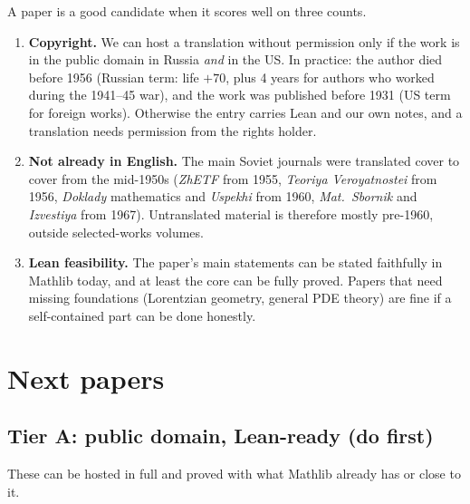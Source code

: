 \documentclass[11pt]{article}
\begin{document}
A paper is a good candidate when it scores well on three counts.
\begin{enumerate}
\item \textbf{Copyright.} We can host a translation without permission only if the work is in the public domain in Russia \emph{and} in the US. In practice: the author died before 1956 (Russian term: life $+70$, plus 4 years for authors who worked during the 1941--45 war), and the work was published before 1931 (US term for foreign works). Otherwise the entry carries Lean and our own notes, and a translation needs permission from the rights holder.
\item \textbf{Not already in English.} The main Soviet journals were translated cover to cover from the mid-1950s (\emph{ZhETF} from 1955, \emph{Teoriya Veroyatnostei} from 1956, \emph{Doklady} mathematics and \emph{Uspekhi} from 1960, \emph{Mat.\ Sbornik} and \emph{Izvestiya} from 1967). Untranslated material is therefore mostly pre-1960, outside selected-works volumes.
\item \textbf{Lean feasibility.} The paper's main statements can be stated faithfully in Mathlib today, and at least the core can be fully proved. Papers that need missing foundations (Lorentzian geometry, general PDE theory) are fine if a self-contained part can be done honestly.
\end{enumerate}

\section{Next papers}

\subsection{Tier A: public domain, Lean-ready (do first)}

These can be hosted in full and proved with what Mathlib already has or close to it.
\end{document}
